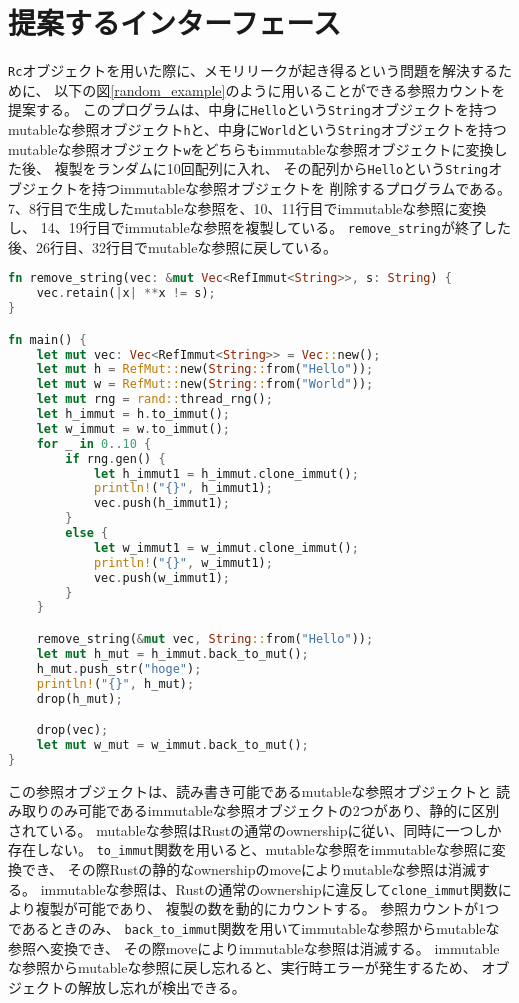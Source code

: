 \documentclass{sumiilab-paper}
\theoremstyle{mystyle}
\numberwithin{definition}{chapter} %
\begin{document}
\section{提案するインターフェース}
\texttt{Rc}オブジェクトを用いた際に、メモリリークが起き得るという問題を解決するために、
以下の図\ref{random_example}のように用いることができる参照カウントを提案する。
このプログラムは、中身に\texttt{Hello}という\texttt{String}オブジェクトを持つ
mutableな参照オブジェクト\texttt{h}と、中身に\texttt{World}という\texttt{String}オブジェクトを持つ
mutableな参照オブジェクト\texttt{w}をどちらもimmutableな参照オブジェクトに変換した後、
複製をランダムに10回配列に入れ、
その配列から\texttt{Hello}という\texttt{String}オブジェクトを持つimmutableな参照オブジェクトを
削除するプログラムである。
7、8行目で生成したmutableな参照を、10、11行目でimmutableな参照に変換し、
14、19行目でimmutableな参照を複製している。
\texttt{remove\_string}が終了した後、26行目、32行目でmutableな参照に戻している。
\begin{lstlisting}[language=Rust, caption=新たな参照オブジェクトを用いた柔軟なメモリ管理の例, 
  label=random_example, captionpos=b]
fn remove_string(vec: &mut Vec<RefImmut<String>>, s: String) {
    vec.retain(|x| **x != s);
}

fn main() {
    let mut vec: Vec<RefImmut<String>> = Vec::new();
    let mut h = RefMut::new(String::from("Hello"));
    let mut w = RefMut::new(String::from("World"));
    let mut rng = rand::thread_rng();
    let h_immut = h.to_immut();
    let w_immut = w.to_immut();
    for _ in 0..10 {
        if rng.gen() {
            let h_immut1 = h_immut.clone_immut();
            println!("{}", h_immut1);
            vec.push(h_immut1);
        }
        else {
            let w_immut1 = w_immut.clone_immut();
            println!("{}", w_immut1);
            vec.push(w_immut1);
        }
    }

    remove_string(&mut vec, String::from("Hello"));
    let mut h_mut = h_immut.back_to_mut();
    h_mut.push_str("hoge");
    println!("{}", h_mut);
    drop(h_mut);

    drop(vec);
    let mut w_mut = w_immut.back_to_mut();
}
\end{lstlisting}
この参照オブジェクトは、読み書き可能であるmutableな参照オブジェクトと
読み取りのみ可能であるimmutableな参照オブジェクトの2つがあり、静的に区別されている。
mutableな参照はRustの通常のownershipに従い、同時に一つしか存在しない。
\texttt{to\_immut}関数を用いると、mutableな参照をimmutableな参照に変換でき、
その際Rustの静的なownershipのmoveによりmutableな参照は消滅する。
immutableな参照は、Rustの通常のownershipに違反して\texttt{clone\_immut}関数により複製が可能であり、
複製の数を動的にカウントする。
参照カウントが1つであるときのみ、
\texttt{back\_to\_immut}関数を用いてimmutableな参照からmutableな参照へ変換でき、
その際moveによりimmutableな参照は消滅する。
immutableな参照からmutableな参照に戻し忘れると、実行時エラーが発生するため、
オブジェクトの解放し忘れが検出できる。
\end{document}
